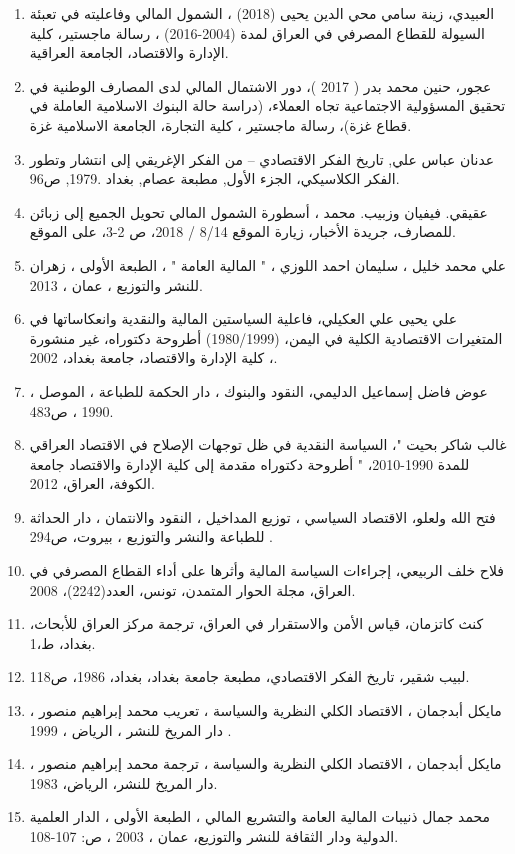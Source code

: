 \documentclass[10pt,a4paper]{report}
\begin{document}
\begin{enumerate}
	\item العبيدي، زينة سامي محي الدين يحيى (2018) ، الشمول المالي وفاعليته في تعبئة السيولة للقطاع المصرفي في العراق لمدة (2004-2016) ، رسالة ماجستير، كلية الإدارة والاقتصاد، الجامعة العراقية.
	\item عجور، حنين محمد بدر ( 2017 )، دور الاشتمال المالي لدى المصارف الوطنية في تحقيق المسؤولية الاجتماعية تجاه العملاء، (دراسة حالة البنوك الاسلامية العاملة في قطاع غزة)، رسالة ماجستير ، كلية التجارة، الجامعة الاسلامية غزة.
	\item عدنان عباس علي, تاريخ الفكر الاقتصادي – من الفكر الإغريقي إلى انتشار وتطور الفكر الكلاسيكي، الجزء الأول, مطبعة عصام, بغداد .1979, ص96.
	\item عقيقي. فيفيان وزبيب. محمد ، أسطورة الشمول المالي تحويل الجميع إلى زبائن للمصارف، جريدة الأخبار، زيارة الموقع 8/14 / 2018، ص 2-3، على الموقع.
	\item علي محمد خليل ، سليمان احمد اللوزي ، " المالية العامة " ، الطبعة الأولى ، زهران للنشر والتوزيع ، عمان ، 2013.
	    \item علي يحيى علي العكيلي، فاعلية السياستين المالية والنقدية وانعكاساتها في المتغيرات الاقتصادية الكلية في اليمن، (1980/1999) أطروحة دكتوراه، غير منشورة ، كلية الإدارة والاقتصاد، جامعة بغداد، 2002.
	\item عوض فاضل إسماعيل الدليمي، النقود والبنوك ، دار الحكمة للطباعة ، الموصل ، 1990 ، ص483.
	\item غالب شاكر بحيت "، السياسة النقدية في ظل توجهات الإصلاح في الاقتصاد العراقي للمدة 1990-2010، " أطروحة دكتوراه مقدمة إلى كلية الإدارة والاقتصاد جامعة الكوفة، العراق، 2012.
	\item فتح الله ولعلو، الاقتصاد السياسي ، توزيع المداخيل ، النقود والانتمان ، دار الحداثة للطباعة والنشر والتوزيع ، بيروت، ص294 .
	\item فلاح خلف الربيعي، إجراءات السياسة المالية وأثرها على أداء القطاع المصرفي في العراق، مجلة الحوار المتمدن، تونس، العدد(2242)، 2008.
	\item كنث كاتزمان، قياس الأمن والاستقرار في العراق، ترجمة مركز العراق للأبحاث، بغداد، ط،1.
	\item لبيب شقير، تاريخ الفكر الاقتصادي، مطبعة جامعة بغداد، بغداد، 1986، ص118.
	\item مايكل أبدجمان ، الاقتصاد الكلي النظرية والسياسة ، تعريب محمد إبراهيم منصور ، دار المريخ للنشر ، الرياض ، 1999 .
	\item مايكل أبدجمان ، الاقتصاد الكلي النظرية والسياسة ، ترجمة محمد إبراهيم منصور ، دار المريخ للنشر، الرياض، 1983.
	\item محمد جمال ذنيبات المالية العامة والتشريع المالي ، الطبعة الأولى ، الدار العلمية الدولية ودار الثقافة للنشر والتوزيع، عمان ، 2003 ، ص: 107-108.

\end{enumerate}
\end{document}
